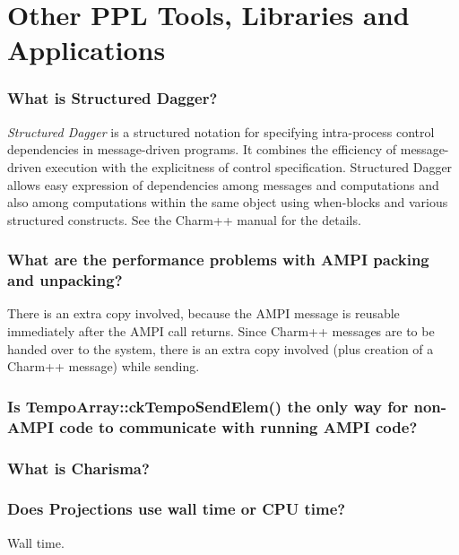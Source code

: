 \section{Other PPL Tools, Libraries and Applications}

\subsubsection{What is Structured Dagger?}

{\em Structured Dagger} is a structured notation for specifying intra-process
control dependencies in message-driven programs. It combines the efficiency
of message-driven execution with the explicitness of control specification.
Structured Dagger allows easy expression of dependencies among messages
and computations and also among computations within the same object using
\textrm{when-blocks}
and various structured constructs. See the Charm++ manual for the details.

\subsubsection{What are the performance problems with AMPI packing and unpacking?}

There is an extra copy involved, because the AMPI message is reusable
immediately after the AMPI call returns. Since Charm++ messages are to
be handed over to the system, there is an extra copy involved (plus creation
of a Charm++ message) while sending.



\subsubsection{Is \textrm{TempoArray::ckTempoSendElem()} the only way for non-AMPI
code to communicate with running AMPI code?}


\subsubsection{What is Charisma?}


\subsubsection{Does Projections use wall time or CPU time?}

Wall time.
